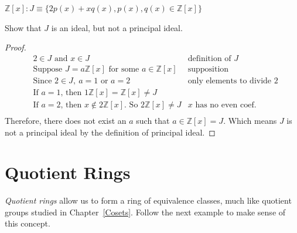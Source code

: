 \begin{example}{}
${\mathbb Z}[x]: J\equiv \{2p(x)+xq(x),p(x),q(x)\in {\mathbb Z}[x]\}$

Show that $J$ is an ideal, but not a principal ideal.\\

\begin{proof}
\begin{align*}
&\text{$2\in J$ and $x\in J$} &\text{definition of $J$}\\
&\text{Suppose $J=a{\mathbb Z}[x]$ for some $a\in {\mathbb Z}[x]$} & \text{supposition}\\
&\text{Since $2\in J,~a=1$ or $a=2$} & \text{only elements to divide 2}\\
&\text{If $a=1$, then $1{\mathbb Z}[x]={\mathbb Z}[x]\neq J$} &\\
&\text{If $a=2$, then $x\notin 2{\mathbb Z}[x]$. So $2{\mathbb Z}[x]\neq J$} & \text{$x$ has no even coef.}\\
\end{align*}
Therefore, there does not exist an $a$ such that $a\in {\mathbb Z}[x]=J$. Which means $J$ is not a principal ideal by the definition of principal ideal.
\end{proof}
\end{example}

\section{Quotient Rings}
\label{sec:Rings:QuotientRings}

\emph{Quotient rings} allow us to form a ring of equivalence classes, much like quotient groups studied in Chapter~\ref{Cosets}.  Follow the next example to make sense of this concept.

